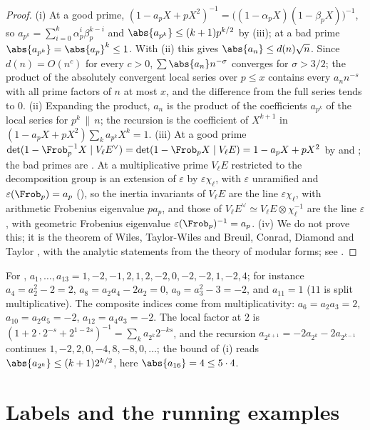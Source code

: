 \begin{proof}
(i) At a good prime, $(1-a_pX+pX^2)^{-1}=\bigl((1-\alpha_pX)(1-\beta_pX)\bigr)^{-1}$, so $a_{p^k}=\sum_{i=0}^k\alpha_p^i\beta_p^{k-i}$ and $\abs{a_{p^k}}\le(k+1)p^{k/2}$ by (iii); at a
bad prime $\abs{a_{p^k}}=\abs{a_p}^k\le1$. With (ii) this gives $\abs{a_n}\le d(n)\sqrt n$. Since $d(n)=O(n^{c})$ for every $c>0$, $\sum\abs{a_n}n^{-\sigma}$ converges for $\sigma>3/2$; the product of
the absolutely convergent local series over $p\le x$ contains every $a_nn^{-s}$ with all prime factors of $n$ at most $x$, and the difference from the full series tends to $0$.
(ii) Expanding the product, $a_n$ is the product of the coefficients $a_{p^k}$ of the local series for $p^k\,\|\,n$; the recursion is the coefficient of $X^{k+1}$ in
$(1-a_pX+pX^2)\sum_ka_{p^k}X^k=1$. (iii) At a good prime $\det(1-\Frob_p^{-1}X\mid V_\ell E^\vee)=\det(1-\Frob_pX\mid V_\ell E)=1-a_pX+pX^2$ by  and ; the bad
primes are . At a multiplicative prime $V_\ell E$ restricted to the decomposition group is an extension of $\varepsilon$ by $\varepsilon\chi_\ell$, with $\varepsilon$ unramified and
$\varepsilon(\Frob_p)=a_p$ (), so the inertia invariants of $V_\ell E$ are the line $\varepsilon\chi_\ell$, with arithmetic Frobenius eigenvalue $pa_p$, and those of
$V_\ell E^\vee\simeq V_\ell E\otimes\chi_\ell^{-1}$ are the line $\varepsilon$, with geometric Frobenius eigenvalue $\varepsilon(\Frob_p)^{-1}=a_p$. (iv) We do not prove this;
it is the theorem of Wiles, Taylor-Wiles and Breuil, Conrad, Diamond and Taylor \cite{Wiles95,TaylorWiles,BCDT}, with the analytic statements from the theory of modular forms; see
.
\end{proof}

\noindent For , $a_1,\dots,a_{13}=1,-2,-1,2,1,2,-2,0,-2,-2,1,-2,4$; for instance $a_4=a_2^2-2=2$, $a_8=a_2a_4-2a_2=0$, $a_9=a_3^2-3=-2$, and $a_{11}=1$ ($11$ is split multiplicative).
The composite indices come from multiplicativity: $a_6=a_2a_3=2$, $a_{10}=a_2a_5=-2$, $a_{12}=a_4a_3=-2$. The local factor at $2$ is
$(1+2\cdot2^{-s}+2^{1-2s})^{-1}=\sum_ka_{2^k}2^{-ks}$, and the recursion $a_{2^{k+1}}=-2a_{2^k}-2a_{2^{k-1}}$ continues $1,-2,2,0,-4,8,-8,0,\dots$; the bound of (i) reads
$\abs{a_{2^k}}\le(k+1)2^{k/2}$, here $\abs{a_{16}}=4\le5\cdot4$.

\section{Labels and the running examples}\label{sec:ellcurves:labels}

